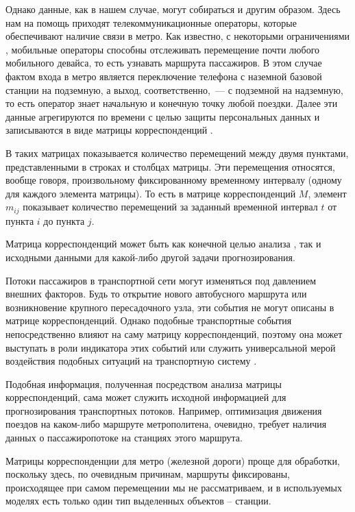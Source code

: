 \documentclass[12pt, fleqn, titlepage]{article}
\begin{document}
    Однако данные, как в нашем случае, могут собираться и другим образом. Здесь нам на помощь приходят телекоммуникационные 
    операторы, которые обеспечивают наличие связи в метро. Как известно, с некоторыми ограничениями \cite{niu2015novel}, 
    мобильные операторы способны отслеживать перемещение почти любого мобильного девайса, то есть узнавать маршрута пассажиров. 
    В этом случае фактом входа в метро является переключение телефона с наземной базовой станции на подземную, а выход, соответственно,~--- 
    с подземной на надземную, то есть оператор знает начальную и конечную точку любой поездки. Далее эти данные агрегируются по 
    времени с целью защиты персональных данных \cite{sweeney2002k} и записываются в виде матрицы корреспонденций \cite{necr2019}.

    В таких матрицах показывается количество перемещений между двумя пунктами, представленными в строках и столбцах матрицы. 
    Эти перемещения относятся, вообще говоря, произвольному фиксированному временному интервалу (одному для каждого элемента 
    матрицы). То есть в матрице корреспонденций $M$, элемент $m_{ij}$ показывает количество
    перемещений за заданный временной интервал $t$ от пункта $i$ до пункта $j$.

    Матрица корреспонденций может быть как конечной целью анализа \cite{djukic2012efficient}, так и исходными данными 
    для какой-либо другой задачи прогнозирования.
    
    Потоки пассажиров в транспортной сети могут изменяться под давлением внешних факторов. Будь то открытие нового автобусного 
    маршрута или возникновение крупного пересадочного узла, эти события не могут описаны в матрице корреспонденций. Однако 
    подобные транспортные события непосредственно влияют на саму матрицу корреспонденций, поэтому она может выступать в роли 
    индикатора этих событий или служить универсальной мерой воздействия подобных ситуаций на транспортную систему \cite{namiot2020}.

    Подобная информация, полученная посредством анализа матрицы корреспонденций, сама может служить исходной информацией 
    для прогнозирования транспортных потоков. Например, оптимизация движения поездов на каком-либо маршруте 
    метрополитена, очевидно, требует наличия данных о пассажиропотоке на станциях этого маршрута.
    
    Матрицы корреспонденции для метро (железной дороги) проще для обработки, поскольку здесь, по очевидным причинам, 
    маршруты фиксированы, происходящее при самом перемещении мы не рассматриваем, и в используемых моделях есть только 
    один тип выделенных объектов – станции.
\end{document}
